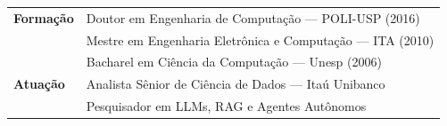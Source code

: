 \bigskip
\noindent
\begin{tabular}{@{}ll}
\textbf{Forma\c{c}\~ao}  & Doutor em Engenharia de Computa\c{c}\~ao --- POLI-USP (2016) \\
                          & Mestre em Engenharia Eletr\^onica e Computa\c{c}\~ao --- ITA (2010) \\
                          & Bacharel em Ci\^encia da Computa\c{c}\~ao --- Unesp (2006) \\[0.4em]
\textbf{Atua\c{c}\~ao}   & Analista S\^enior de Ci\^encia de Dados --- Ita\'u Unibanco \\
                          & Pesquisador em LLMs, RAG e Agentes Aut\^onomos \\
\end{tabular}
